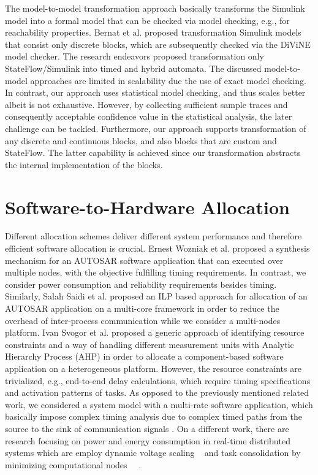 The model-to-model transformation approach basically transforms the Simulink model into a formal model that can be checked via model checking, e.g., for reachability properties. Bernat et al. \cite{Meenakshi2006ToolChecker} proposed transformation Simulink models that consist only discrete blocks, which are subsequently checked via the DiViNE model checker. The research endeavors proposed transformation only StateFlow/Simulink into timed and hybrid automata. The discussed model-to-model approaches are limited in scalability due the use of exact model checking. In contrast, our approach uses statistical model checking, and thus scales better albeit is not exhaustive. However, by collecting sufficient sample traces and consequently acceptable confidence value in the statistical analysis, the later challenge can be tackled. Furthermore, our approach supports transformation of any discrete and continuous blocks, and also blocks that are custom and StateFlow. The latter capability is achieved since our transformation abstracts the internal implementation of the blocks.


\section{Software-to-Hardware Allocation}
Different allocation schemes deliver different system performance and therefore efficient software allocation is crucial. Ernest Wozniak et al. \cite{Wozniak2013AnArchitectures} proposed a synthesis mechanism for an AUTOSAR software application that can executed over multiple nodes, with the objective fulfilling timing requirements. In contrast, we consider power consumption and reliability requirements besides timing. Similarly, Salah Saidi et al. \cite{Saidi2015AnArchitectures} proposed an ILP based approach for allocation of an AUTOSAR application on a multi-core framework in order to reduce the overhead of inter-process communication while we consider a multi-nodes platform. Ivan Svogor et al. \cite{vsvogor2014extended} proposed a generic approach of identifying resource constraints and a way of handling different measurement units with Analytic Hierarchy Process (AHP) in order to allocate a component-based software application on a heterogeneous platform. However, the resource constraints are trivialized, e.g., end-to-end delay calculations, which require timing specifications and activation patterns of tasks. As opposed to the previously mentioned related work, we considered a system model with a multi-rate software application, which basically impose complex timing analysis due to complex timed paths from the source to the sink of communication signals \cite{mubeen2013support}. On a different work, there are research focusing on power and energy consumption in real-time distributed systems which are employ dynamic voltage scaling ~\cite{bambagini2016energy} and task consolidation by minimizing computational nodes ~\cite{faragardi2013towards}~\cite{devadas2012interplay}.